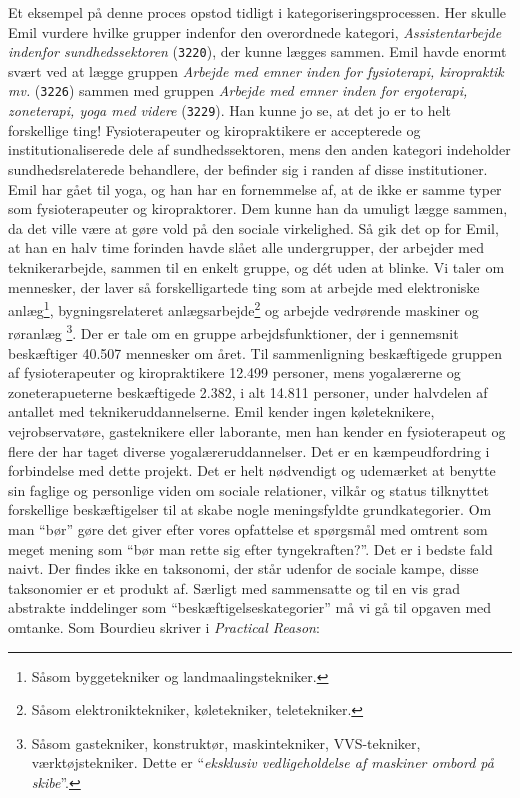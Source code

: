 Et eksempel på denne proces opstod tidligt i kategoriseringsprocessen. Her skulle Emil vurdere hvilke grupper indenfor den overordnede kategori, \emph{Assistentarbejde indenfor sundhedssektoren} (\texttt{3220}), der kunne lægges sammen. Emil havde enormt svært ved at lægge gruppen \emph{Arbejde med emner inden for fysioterapi, kiropraktik mv.} (\texttt{3226}) sammen med gruppen \emph{Arbejde med emner inden for ergoterapi, zoneterapi, yoga med videre} (\texttt{3229}). Han kunne jo se, at det jo er to helt forskellige ting! Fysioterapeuter og kiropraktikere er accepterede og institutionaliserede dele af sundhedssektoren, mens den anden kategori indeholder sundhedsrelaterede behandlere, der befinder sig i randen af disse institutioner. Emil har gået til yoga, og han har en fornemmelse af, at de ikke er samme typer som fysioterapeuter og kiropraktorer. Dem kunne han da umuligt lægge sammen, da det ville være at gøre vold på den sociale virkelighed. Så gik det op for Emil, at han en halv time forinden havde slået alle undergrupper, der arbejder med teknikerarbejde, sammen til en enkelt gruppe, og dét uden at blinke. Vi taler om mennesker, der laver så forskelligartede ting som at arbejde med elektroniske anlæg\footnote{Såsom byggetekniker og landmaalingstekniker.}, bygningsrelateret anlægsarbejde\footnote{Såsom elektroniktekniker, køletekniker, teletekniker.} og arbejde vedrørende maskiner og røranlæg \footnote{Såsom gastekniker, konstruktør, maskintekniker, VVS-tekniker, værktøjstekniker. Dette er “\emph{eksklusiv vedligeholdelse af maskiner ombord på skibe}”.}. Der er tale om en gruppe arbejdsfunktioner, der i gennemsnit beskæftiger 40.507 mennesker om året. Til sammenligning beskæftigede gruppen af fysioterapeuter og kiropraktikere 12.499 personer, mens yogalærerne og zoneterapueterne beskæftigede 2.382, i alt 14.811 personer, under halvdelen af antallet med teknikeruddannelserne. Emil kender ingen køleteknikere, vejrobservatøre, gasteknikere eller laborante, men han kender en fysioterapeut og flere der har taget diverse yogalæreruddannelser. Det er en kæmpeudfordring i forbindelse med dette projekt. Det er helt nødvendigt og udemærket at benytte sin faglige og personlige viden om sociale relationer, vilkår og status tilknyttet forskellige beskæftigelser til at skabe nogle meningsfyldte grundkategorier. Om man “bør” gøre det giver efter vores opfattelse et spørgsmål med omtrent som meget mening som “bør man rette sig efter tyngekraften?”. Det er i bedste fald naivt. Der findes ikke en taksonomi, der står udenfor de sociale kampe, disse taksonomier er et produkt af. Særligt med sammensatte og til en vis grad abstrakte inddelinger som “beskæftigelseskategorier” må vi gå til opgaven med omtanke. Som Bourdieu skriver i \emph{Practical Reason}:
